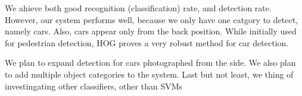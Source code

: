 
We ahieve both good recognition (classification) rate, and detection rate. However, our system performs well, because we only have one catgory to detect, namely cars. Also, cars appear only from the back position. While initially used for pedestrian detection, HOG proves a very robust method for car detection.

We plan to expand detection for cars photographed from the side.
We also plan to add multiple object categories to the system.
Last but not least, we thing of investingating other classifiers, other than SVMs
